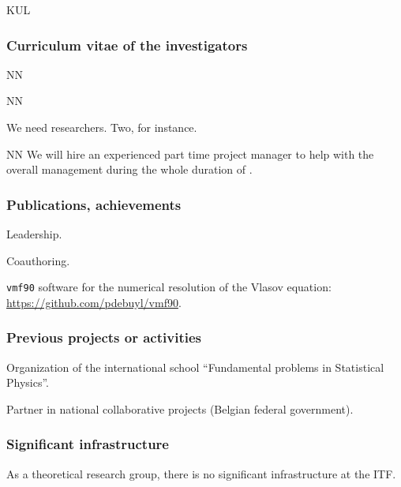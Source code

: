 \begin{sitedescription}{KUL}
\subsubsection*{Curriculum vitae of the investigators}




\begin{participant}[type=res,PM=48,salary=5500]{NN}
\end{participant}
\begin{participant}[type=res,PM=36,salary=5500]{NN}

We need researchers. Two, for instance.

\end{participant}

\begin{participant}[type=res,PM=24,salary=3932]{NN}
  We will hire an experienced part time project manager to help with
  the overall management during the whole duration of \TheProject.
\end{participant}

\subsubsection*{Publications, achievements}

\begin{compactenum}
\item Leadership.
\item Coauthoring.
\item {\tt vmf90} software for the numerical resolution of the Vlasov equation:
\url{https://github.com/pdebuyl/vmf90}.
\end{compactenum}


\subsubsection*{Previous projects or activities}

\begin{compactenum}
\item Organization of the international school ``Fundamental problems in
  Statistical Physics''.
\item Partner in national collaborative projects (Belgian federal government).
\end{compactenum}

\subsubsection*{Significant infrastructure}

As a theoretical research group, there is no significant infrastructure at the ITF.

\end{sitedescription}



